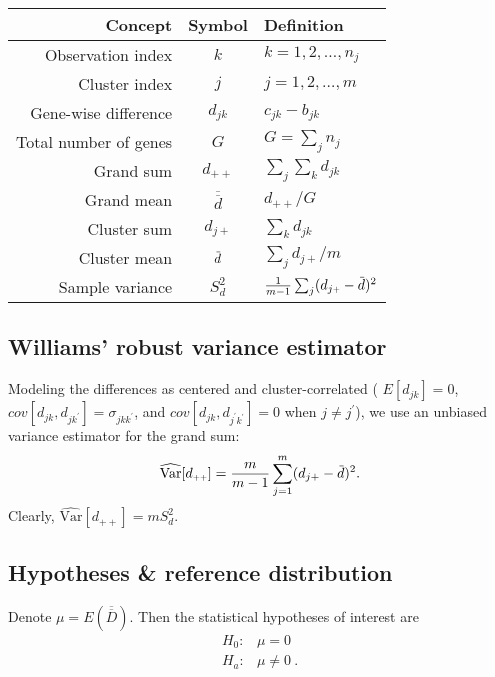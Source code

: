 \documentclass[a0,portrait]{a0poster}
\newcommand*{\barbar}[1]{\overline{\overline{#1}}}
\newcommand{\overbar}[1]{\mkern 3mu\overline{\mkern-3mu#1\mkern-1.mu}\mkern 1.mu}
\begin{document}
\begin{multicols}{3}
\begin{tabular}{r | c | l }
    Concept & Symbol & Definition \\
    \hline \hline
      Observation index & $k$ & $k = 1,2,\ldots,n_j$ \\
      Cluster index & $j$ & $j = 1,2,\ldots,m$ \\
      Gene-wise difference & $d_{jk}$ & $c_{jk} - b_{jk}$ \\
      Total number of genes & $G$ & $G = \sum_{j} n_{j}$ \\
      Grand sum & $d_{\scriptscriptstyle{++}}$ & $\sum_j \sum_k d_{jk}$ \\
      Grand mean & $\barbar{d}$ & $d_{\scriptscriptstyle{++}}/G$ \\
      Cluster sum & $d_{j\scriptscriptstyle{+}}$ & $\sum_k d_{jk}$ \\
      Cluster mean & $\overbar{d}$ & $\sum_j d_{j\scriptscriptstyle{+}}/m$ \\
    Sample variance & $S_{d}^{2}$ & $\frac{1}{m-1}\sum_j(d_{j\scriptscriptstyle{+}} - \overbar{d})^2$\\
  \end{tabular}

\subsection{Williams' robust variance estimator~\cite{Williams2000}}
Modeling the differences as centered and cluster-correlated ( $E[d_{jk}]=0$, $cov[d_{jk},d_{jk^{\prime}}]=\sigma_{jkk^{\prime}}$, and $cov[d_{jk},d_{j^{\prime}k^{\prime}}]=0$ when $j\neq j^{\prime}$),
we use an unbiased variance estimator for the grand sum:
\begin{equation}
\label{eq:var}
\widehat{\text{Var}}[d_{\scriptscriptstyle{++}}] = \frac{m}{m-1}\sum_{j=1}^m(d_{j+} - \overbar{d})^2.
\end{equation}
Clearly, $\widehat{\text{Var}}[d_{\scriptscriptstyle{++}}] = mS_d^2$.

\subsection{Hypotheses \& reference distribution}
Denote $\mu = E\left(\barbar{D}\right)$. Then the statistical hypotheses of interest are
\begin{equation}
 \label{eq:hypotheses}
 \begin{array}{rl}
 H_{0}: & \mu = 0 \\
 H_{a}: & \mu \neq 0 \ .
 \end{array}
 \end{equation}


\end{multicols}
\end{document}
